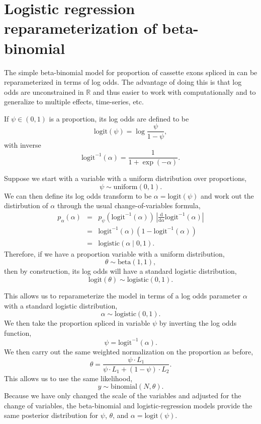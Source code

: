 \documentclass[11pt]{report}
\newcommand{\logit}{\textrm{logit}}
\newcommand{\ilogit}{\logit^{-1}}
\newcommand{\deriv}[1]{\frac{\textrm{d}}{\textrm{d}#1}}
\begin{document}
\section{Logistic regression reparameterization of beta-binomial}

The simple beta-binomial model for proportion of cassette exons
spliced in can be reparameterized in terms of log odds.  The advantage
of doing this is that log odds are unconstrained in $\mathbb{R}$ and
thus easier to work with computationally and to generalize to multiple
effects, time-series, etc.

If $\psi \in (0, 1)$ is a proportion, its log odds are defined to be
\[
  \logit(\psi) = \log \frac{\psi}{1 - \psi},
\]
with inverse
\[
  \ilogit(\alpha) = \frac{1}{1 + \exp(-\alpha)}.
\]

Suppose we start with a variable with a uniform distribution over
proportions,
\[
  \psi \sim \textrm{uniform}(0, 1).
\]
We can then define its log odds transform to be $\alpha =
\logit(\psi)$ and work out the distirbution of $\alpha$ through the
usual change-of-variables formula,
%
\begin{eqnarray*}
  p_{\alpha}(\alpha)
  & = & p_{\psi}(\ilogit(\alpha))
        \, \left| \deriv{\alpha} \ilogit(\alpha) \right|
  \\[4pt]
  & = & \ilogit(\alpha) (1 - \ilogit(\alpha))
  \\[4pt]
  & = & \textrm{logistic}(\alpha \mid 0, 1).
\end{eqnarray*}
%
Therefore, if we have a proportion variable with a uniform
distribution,
\[
  \theta \sim \textrm{beta}(1, 1),
\]
then by construction, its log odds will have a standard logistic
distribution,
\[
  \logit(\theta) \sim \textrm{logistic}(0, 1).
\]

This allows us to reparameterize the model in terms of a log odds
parameter $\alpha$ with a standard logistic distribution,
\[
  \alpha \sim \textrm{logistic}(0, 1).
\]
We then take the proportion spliced in variable $\psi$ by inverting
the log odds function,
\[
  \psi = \ilogit(\alpha).
\]
We then carry out the same weighted normalization on the proportion as
before,
\[
  \theta = \frac{\psi \cdot L_1}{\psi \cdot L_1 + (1 - \psi) \cdot L_2}.
\]
This allows us to use the same likelihood,
\[
  y \sim \textrm{binomial}(N, \theta).
\]
Because we have only changed the scale of the variables and adjusted
for the change of variables, the beta-binomial and logistic-regression
models provide the same posterior distribution for $\psi$, $\theta$,
and $\alpha = \logit(\psi)$.
\end{document}
